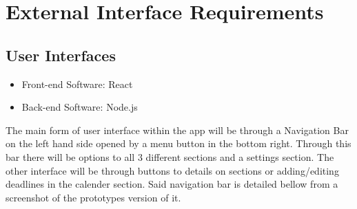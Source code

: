\documentclass[a4paper]{article}
\begin{document}
\pagebreak

\section {External Interface Requirements}
\subsection {User Interfaces}
\begin{itemize}
	\item Front-end Software: React
	\item Back-end Software: Node.js
\end{itemize}
The main form of user interface within the app will be through a Navigation Bar on the left hand side opened by a menu button in the bottom right. Through this bar there will be options to all 3 different sections and a settings section. The other interface will be through buttons to details on sections or adding/editing deadlines in the calender section. Said navigation bar is detailed bellow from a screenshot of the prototypes version of it.
\end{document}
